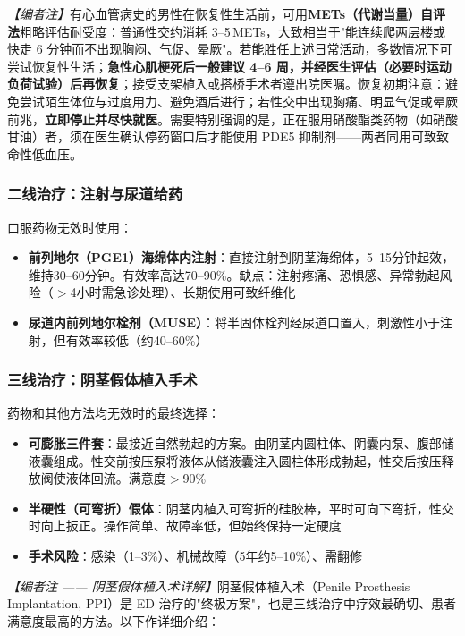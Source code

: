 \documentclass[12pt,a4paper,twoside]{ctexbook}
\begin{document}
\noindent\textit{【编者注】}有心血管病史的男性在恢复性生活前，可用\textbf{METs（代谢当量）自评法}粗略评估耐受度：普通性交约消耗 3--5\,METs，大致相当于"能连续爬两层楼或快走 6 分钟而不出现胸闷、气促、晕厥"。若能胜任上述日常活动，多数情况下可尝试恢复性生活；\textbf{急性心肌梗死后一般建议 4--6 周，并经医生评估（必要时运动负荷试验）后再恢复}；接受支架植入或搭桥手术者遵出院医嘱。恢复初期注意：避免尝试陌生体位与过度用力、避免酒后进行；若性交中出现胸痛、明显气促或晕厥前兆，\textbf{立即停止并尽快就医}。需要特别强调的是，正在服用硝酸酯类药物（如硝酸甘油）者，须在医生确认停药窗口后才能使用 PDE5 抑制剂——两者同用可致致命性低血压。

\subsubsection{二线治疗：注射与尿道给药}

口服药物无效时使用：
\begin{itemize}[leftmargin=2cm]
	\item \textbf{前列地尔（PGE1）海绵体内注射}：直接注射到阴茎海绵体，5--15分钟起效，维持30--60分钟。有效率高达70--90\%。缺点：注射疼痛、恐惧感、异常勃起风险（$>$4小时需急诊处理）、长期使用可致纤维化
	\item \textbf{尿道内前列地尔栓剂（MUSE）}：将半固体栓剂经尿道口置入，刺激性小于注射，但有效率较低（约40--60\%）
\end{itemize}

\subsubsection{三线治疗：阴茎假体植入手术}
\label{subsec:penile_prosthesis}

药物和其他方法均无效时的最终选择：
\begin{itemize}[leftmargin=2cm]
	\item \textbf{可膨胀三件套}：最接近自然勃起的方案。由阴茎内圆柱体、阴囊内泵、腹部储液囊组成。性交前按压泵将液体从储液囊注入圆柱体形成勃起，性交后按压释放阀使液体回流。满意度$>$90\%
	\item \textbf{半硬性（可弯折）假体}：阴茎内植入可弯折的硅胶棒，平时可向下弯折，性交时向上扳正。操作简单、故障率低，但始终保持一定硬度
	\item \textbf{手术风险}：感染（1--3\%）、机械故障（5年约5--10\%）、需翻修
\end{itemize}

\noindent\textit{【编者注 —— 阴茎假体植入术详解】}阴茎假体植入术（Penile Prosthesis Implantation, PPI）是 ED 治疗的"终极方案"，也是三线治疗中疗效最确切、患者满意度最高的方法。以下作详细介绍：
\end{document}
